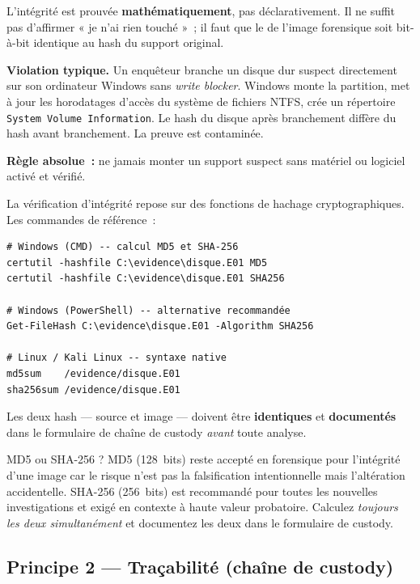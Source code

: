 L'intégrité est prouvée \textbf{mathématiquement}, pas déclarativement.
Il ne suffit pas d'affirmer « je n'ai rien touché »~; il faut que le
 de l'image forensique soit bit-à-bit identique au hash du
support original.

\begin{boxalert}
\textbf{Violation typique.} Un enquêteur branche un disque dur suspect
directement sur son ordinateur Windows sans \textit{write blocker}. Windows
monte la partition, met à jour les horodatages d'accès du système de fichiers
NTFS, crée un répertoire \texttt{System Volume Information}. Le hash du disque
après branchement diffère du hash avant branchement. La preuve est contaminée.

\smallskip
\textbf{Règle absolue~:} ne jamais monter un support suspect sans
 matériel ou logiciel activé et vérifié.
\end{boxalert}

La vérification d'intégrité repose sur des fonctions de hachage
cryptographiques. Les commandes de référence~:

\begin{lstlisting}[language=bash_forensique,
    caption={Calcul et vérification d'empreintes cryptographiques}]
# Windows (CMD) -- calcul MD5 et SHA-256
certutil -hashfile C:\evidence\disque.E01 MD5
certutil -hashfile C:\evidence\disque.E01 SHA256

# Windows (PowerShell) -- alternative recommandée
Get-FileHash C:\evidence\disque.E01 -Algorithm SHA256

# Linux / Kali Linux -- syntaxe native
md5sum    /evidence/disque.E01
sha256sum /evidence/disque.E01
\end{lstlisting}

Les deux hash --- source et image --- doivent être \textbf{identiques} et
\textbf{documentés} dans le formulaire de chaîne de custody \emph{avant}
toute analyse.

\begin{boiteRemarque}{MD5 ou SHA-256 ?}
MD5 (128~bits) reste accepté en forensique pour l'intégrité d'une image
car le risque n'est pas la falsification intentionnelle mais l'altération
accidentelle. SHA-256 (256~bits) est recommandé pour toutes les nouvelles
investigations et exigé en contexte à haute valeur probatoire. Calculez
\emph{toujours les deux simultanément} et documentez les deux dans le
formulaire de custody.
\end{boiteRemarque}

\subsection{Principe 2 --- Traçabilité (chaîne de custody)}
\label{subsec:principe-tracabilite}

